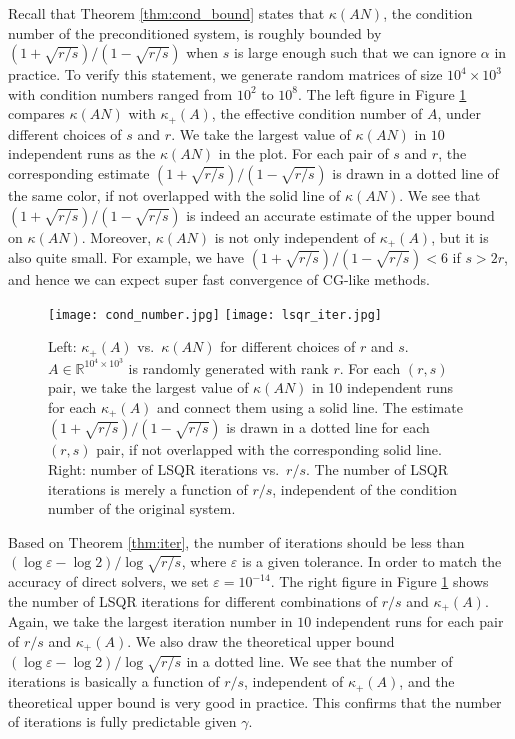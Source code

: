 \documentclass{siamltex}
\begin{document}
Recall that Theorem \ref{thm:cond_bound} states that $\kappa(AN)$, the condition
number of the preconditioned system, is roughly bounded by
$(1+\sqrt{r/s})/(1-\sqrt{r/s})$ when $s$ is large enough such that we can ignore
$\alpha$ in practice. To verify this statement, we generate random matrices of
size $10^4 \times 10^3$ with condition numbers ranged from $10^2$ to $10^8$. The
left figure in Figure \ref{fig:cond_and_iter} compares $\kappa(AN)$ with
$\kappa_+(A)$, the effective condition number of $A$, under different choices of
$s$ and $r$. We take the largest value of $\kappa(AN)$ in $10$ independent runs
as the $\kappa(AN)$ in the plot. For each pair of $s$ and $r$, the corresponding
estimate $(1+\sqrt{r/s})/(1-\sqrt{r/s})$ is drawn in a dotted line of the same
color, if not overlapped with the solid line of $\kappa(AN)$. We see that
$(1+\sqrt{r/s})/(1-\sqrt{r/s})$ is indeed an accurate estimate of the upper
bound on $\kappa(AN)$.  Moreover, $\kappa(AN)$ is not only independent of
$\kappa_+(A)$, but it is also quite small. For example, we have
$(1+\sqrt{r/s})/(1-\sqrt{r/s}) < 6$ if $s > 2 r$, and hence we can expect super
fast convergence of CG-like methods.
\begin{figure}
  \centering
  \texttt{[image: cond\_number.jpg]}
  \texttt{[image: lsqr\_iter.jpg]}
  \caption{Left: $\kappa_+(A)$ vs.\ $\kappa(AN)$ for different choices of $r$
    and $s$. $A \in \mathbb{R}^{10^4 \times 10^3}$ is randomly generated with
    rank $r$. For each $(r,s)$ pair, we take the largest value of $\kappa(AN)$
    in 10 independent runs for each $\kappa_+(A)$ and connect them using a solid
    line. The estimate $(1+\sqrt{r/s})/(1-\sqrt{r/s})$ is drawn in a dotted line
    for each $(r,s)$ pair, if not overlapped with the corresponding solid
    line. Right: number of LSQR iterations vs.\ $r/s$. The number of LSQR
    iterations is merely a function of $r/s$, independent of the condition
    number of the original system.}
  \label{fig:cond_and_iter}
\end{figure}
Based on Theorem \ref{thm:iter}, the number of iterations should be less than
$(\log \varepsilon-\log 2)/\log \sqrt{r/s}$, where $\varepsilon$ is a given
tolerance. In order to match the accuracy of direct solvers, we set $\varepsilon
= 10^{-14}$. The right figure in Figure \ref{fig:cond_and_iter} shows the number
of LSQR iterations for different combinations of $r/s$ and $\kappa_+(A)$. Again,
we take the largest iteration number in $10$ independent runs for each pair of
$r/s$ and $\kappa_+(A)$. We also draw the theoretical upper bound $(\log
\varepsilon - \log 2)/\log \sqrt{r/s}$ in a dotted line. We see that the number of
iterations is basically a function of $r/s$, independent of $\kappa_+(A)$, and
the theoretical upper bound is very good in practice.  This confirms that the
number of iterations is fully predictable given $\gamma$.
\end{document}
